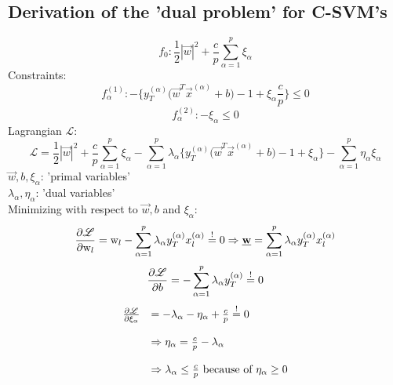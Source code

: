 \subsection{Derivation of the 'dual problem' for C-SVM's}
\begin{equation}
	f_0: \frac{1}{2} | \vec{w} |^2 +
		\frac{c}{p} \sum_{ \alpha = 1}^p \xi_\alpha
\end{equation}
Constraints:
\begin{equation}
	f_\alpha^{ (1) }: -\Big\{ y_T^{ (\alpha) } \big( 
		\vec{w}^T 
		\vec{x}^{ (\alpha) }
		+ b \big) - 1 + \xi_\alpha
	\frac{c}{p}\Big\} \leq 0 
\end{equation}
\begin{equation}
	f_\alpha^{ (2) }: -\xi_\alpha \leq 0
\end{equation}
Lagrangian $\mathscr{L}$:
\begin{equation}
	\mathscr{L} = \frac{1}{2} | \vec{w} |^2 +
		\frac{c}{p} \sum_{ \alpha = 1}^p \xi_\alpha
	-\sum_{ \alpha = 1 }^p \lambda_\alpha \Big\{ y_T^{ (\alpha) } \big( 
		\vec{w}^T 
		\vec{x}^{ (\alpha) }
		+ b \big) - 1 + \xi_\alpha \Big\}
	-\sum_{ \alpha = 1 }^p \eta_\alpha \xi_\alpha
\end{equation}
$\vec{w}, b, \xi_\alpha$: 'primal variables'\\
$\lambda_\alpha, \eta_\alpha$: 'dual variables'\\
Minimizing with respect to $\vec{w}, b$ and $\xi_\alpha$:
\begin{equation}
	\frac{\partial \mathscr{L}}{\partial \mathrm{ w }_l } =
		\mathrm{ w }_l - \sum_{ \alpha = 1 }^p \lambda_\alpha
			y_T^{ (\alpha) } x_l^{ (\alpha) } \stackrel{\mathrm{!}}{=} 0
	\Rightarrow \underline{\mathbf{w}} = 
		\sum_{ \alpha = 1 }^p \lambda_\alpha
			y_T^{ (\alpha) } x_l^{ (\alpha) }
\end{equation}
\begin{equation}
	\frac{\partial \mathscr{L}}{\partial b } =
	-\sum_{ \alpha = 1 }^p \lambda_\alpha
			y_T^{ (\alpha) } \stackrel{\mathrm{!}}{=} 0
\end{equation}
\begin{equation}
	\begin{array}{ll}
	\frac{\partial \mathscr{L}}{\partial \xi_\alpha } 
	& = -\lambda_\alpha -\eta_\alpha + \frac{c}{p} \stackrel{\mathrm{!}}{=} 0 \\\\
	& \Rightarrow \eta_\alpha = \frac{c}{p} - \lambda_\alpha \\\\
	& \Rightarrow \lambda_\alpha \leq \frac{c}{p} 
		\textrm{ because of } \eta_\alpha \geq 0
	\end{array}
\end{equation}
